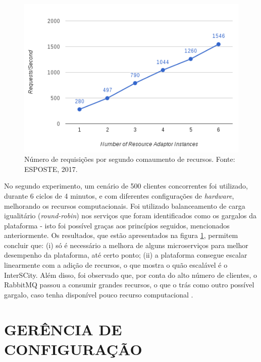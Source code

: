 \begin{figure}
  \centering
    \includegraphics[scale=0.5]{figuras/benchmark2.png}
    \caption{Número de requisições por segundo comaumento de recursos. Fonte: ESPOSTE, 2017.}
  \label{fig:benchmark2}
\end{figure}

No segundo experimento, um cenário de 500 clientes concorrentes foi utilizado, 
durante 6 ciclos de 4 minutos, e com diferentes configurações de
\textit{hardware}, melhorando os recursos computacionais. Foi utilizado
balanceamento de carga igualitário (\textit{round-robin}) nos serviços
que foram identificados como os gargalos da plataforma - isto foi possível
graças aos princípios seguidos, mencionados anteriormente. Os resultados,
que estão apresentados na figura \ref{fig:benchmark2}, permitem concluir que:
(i) só é necessário a melhora de alguns microserviços para melhor desempenho
da plataforma, até certo ponto; (ii) a plataforma consegue escalar linearmente
com a adição de recursos, o que mostra o quão escalável é o InterSCity. Além
disso, foi observado que, por conta do alto número de clientes, o RabbitMQ
passou a consumir grandes recursos, o que o trás como outro possível gargalo,
caso tenha disponível pouco recurso computacional \cite{delesposte2017}.

\section{GERÊNCIA DE CONFIGURAÇÃO}

